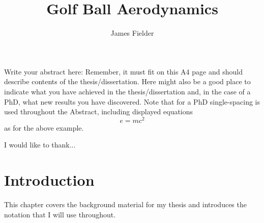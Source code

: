 \documentclass[12pt,MSc,twoside]{muthesis}
\begin{document}
\title{Golf Ball Aerodynamics}
\author{James Fielder}
\def\wordcount{xxxxx}




\beforeabstract

Write your abstract here: Remember, it must fit on this A4 page and should
describe contents of the thesis/dissertation. Here might also be a good place
to indicate what you have achieved in the thesis/dissertation and, in the
case of a PhD, what new results you have discovered. Note that for a PhD
single-spacing is used throughout the Abstract, including displayed equations
\[
e = mc^{2}
\]
as for the above example.

\afterabstract

I would like to thank...

\afterpreface



\chapter{Introduction}
This chapter covers the background material for my thesis and introduces
the notation that I will use throughout.
\end{document}
